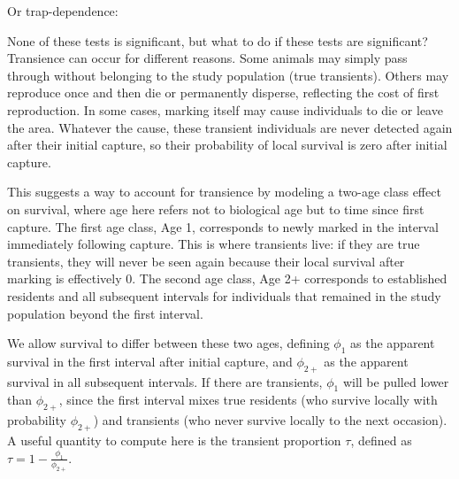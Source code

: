 \documentclass[
  12pt,
]{krantz}
\newenvironment{Shaded}{\begin{snugshade}}{\end{snugshade}}
\newcommand{\DocumentationTok}[1]{\textcolor[rgb]{0.56,0.35,0.01}{\textbf{\textit{#1}}}}
\newcommand{\FunctionTok}[1]{\textcolor[rgb]{0.13,0.29,0.53}{\textbf{#1}}}
\newcommand{\NormalTok}[1]{#1}
\begin{document}
Or trap-dependence:

\begin{Shaded}
\end{Shaded}

None of these tests is significant, but what to do if these tests are significant?
Transience can occur for different reasons. Some animals may simply pass through without belonging to the study population (true transients). Others may reproduce once and then die or permanently disperse, reflecting the cost of first reproduction. In some cases, marking itself may cause individuals to die or leave the area. Whatever the cause, these transient individuals are never detected again after their initial capture, so their probability of local survival is zero after initial capture.

This suggests a way to account for transience by modeling a two-age class effect on survival, where age here refers not to biological age but to time since first capture. The first age class, Age 1, corresponds to newly marked in the interval immediately following capture. This is where transients live: if they are true transients, they will never be seen again because their local survival after marking is effectively 0. The second age class, Age 2+ corresponds to established residents and all subsequent intervals for individuals that remained in the study population beyond the first interval.

We allow survival to differ between these two ages, defining \(\phi_1\) as the apparent survival in the first interval after initial capture, and \(\phi_{2+}\) as the apparent survival in all subsequent intervals. If there are transients, \(\phi_1\) will be pulled lower than \(\phi_{2+}\), since the first interval mixes true residents (who survive locally with probability \(\phi_{2+}\)) and transients (who never survive locally to the next occasion). A useful quantity to compute here is the transient proportion \(\tau\), defined as \(\displaystyle \tau = 1 - \frac{\phi_{1}}{\phi_{2+}}\).
\end{document}
